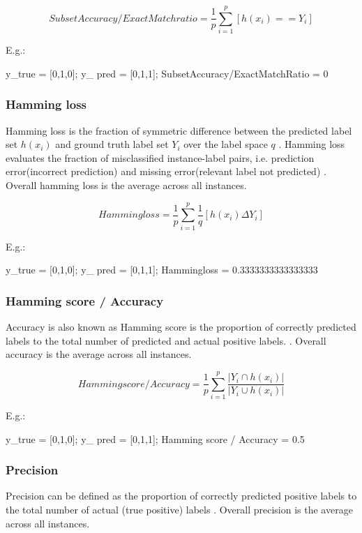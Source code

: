  $$Subset Accuracy / Exact Match ratio = \frac{1}{p}\sum_{i =1}^{p}[h(x_i) == Y_i]$$

E.g.: 

y\_true = [0,1,0]; 
y\_ pred = [0,1,1];  
SubsetAccuracy/ExactMatchRatio = 0
 
\subsubsection{Hamming loss}

Hamming loss is the fraction of symmetric difference between the predicted label set $h(x_i)$ and ground truth label set $Y_i$ over the label space $q$ \cite{zhang2010multi}. Hamming loss evaluates the fraction of misclassified  instance-label pairs, i.e. prediction error(incorrect prediction) and missing error(relevant label not predicted) \cite{sorower2010literature}.  Overall hamming loss is the average across all instances.

 $$Hammingloss = \frac{1}{p}\sum_{i =1}^{p}\frac{1}{q}[h(x_i) \Delta Y_i]$$ \cite{zhang2010multi}
 

E.g.: 

y\_true = [0,1,0]; 
y\_ pred = [0,1,1];  
Hammingloss = 0.3333333333333333


\subsubsection{Hamming score / Accuracy}

 Accuracy is also known as Hamming score is the proportion of correctly predicted labels to the total number of predicted and actual positive labels. \cite{sorower2010literature}.  Overall accuracy is the average across all instances.

$$Hamming score / Accuracy = \frac{1}{p}\sum_{i =1}^{p}\frac{|Y_i \cap h(x_i)|}{|Y_i \cup h(x_i)|}$$ \cite{zhang2010multi}


E.g.: 

y\_true = [0,1,0]; 
y\_ pred = [0,1,1];  
Hamming score / Accuracy = 0.5

\subsubsection{Precision}

Precision can be defined as the proportion of correctly predicted positive labels to the total number of actual (true positive)
labels \cite{sorower2010literature}. Overall precision is the average across all instances.

